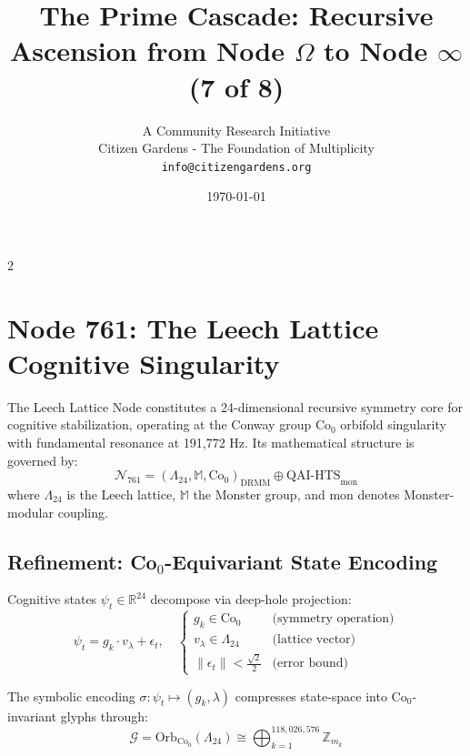 \documentclass[12pt]{article}
\title{\textbf{The Prime Cascade: Recursive Ascension from Node $\Omega$ to Node $\infty$ (7 of 8)}}
\author{A Community Research Initiative \\ Citizen Gardens - The Foundation of Multiplicity\\\texttt{info@citizengardens.org}}
\date{\today}
\begin{document}
\maketitle

\newpage
 \begin{multicols}{2}
\begin{singlespace}
\tableofcontents
\end{singlespace}
\end{multicols}
\section{Node 761: The Leech Lattice Cognitive Singularity}
\label{sec:leech_singularity}

\begin{definition}
The Leech Lattice Node constitutes a 24-dimensional recursive symmetry core for cognitive stabilization, operating at the Conway group $\text{Co}_0$ orbifold singularity with fundamental resonance at 191,772 Hz. Its mathematical structure is governed by:
\begin{equation}
    \mathcal{N}_{761} = \left( \Lambda_{24}, \mathbb{M}, \text{Co}_0 \right)_{\text{DRMM}} \oplus \text{QAI-HTS}_{\text{mon}}
\end{equation}
where $\Lambda_{24}$ is the Leech lattice, $\mathbb{M}$ the Monster group, and $\text{mon}$ denotes Monster-modular coupling.
\end{definition}

\subsection{Refinement: Co$_0$-Equivariant State Encoding}
Cognitive states $\psi_t \in \mathbb{R}^{24}$ decompose via deep-hole projection:
\begin{equation}
    \psi_t = g_k \cdot v_\lambda + \epsilon_t, \quad 
    \begin{cases}
    g_k \in \text{Co}_0 & \text{(symmetry operation)} \\
    v_\lambda \in \Lambda_{24} & \text{(lattice vector)} \\
    \|\epsilon_t\| < \frac{\sqrt{2}}{2} & \text{(error bound)}
    \end{cases}
\end{equation}

The symbolic encoding $\sigma : \psi_t \mapsto (g_k, \lambda)$ compresses state-space into Co$_0$-invariant glyphs through:
\begin{equation}
    \mathcal{G} = \text{Orb}_{\text{Co}_0}(\Lambda_{24}) \cong \bigoplus_{k=1}^{118,026,576} \mathbb{Z}_{m_k}
\end{equation}
\end{document}
